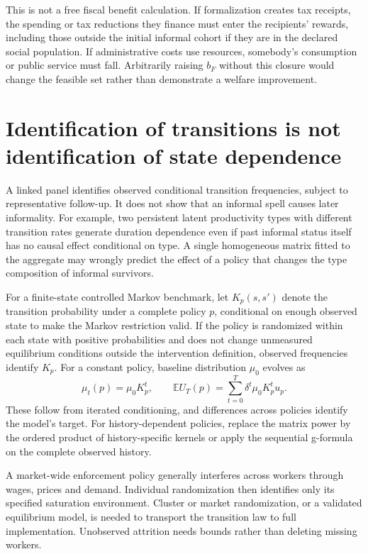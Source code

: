 \documentclass[11pt]{article}
\newcommand{\E}{\mathbb E}
\begin{document}
This is not a free fiscal benefit calculation. If formalization creates tax receipts, the spending or tax reductions they finance must enter the recipients' rewards, including those outside the initial informal cohort if they are in the declared social population. If administrative costs use resources, somebody's consumption or public service must fall. Arbitrarily raising $b_F$ without this closure would change the feasible set rather than demonstrate a welfare improvement.

\section*{Identification of transitions is not identification of state dependence}
A linked panel identifies observed conditional transition frequencies, subject to representative follow-up. It does not show that an informal spell causes later informality. For example, two persistent latent productivity types with different transition rates generate duration dependence even if past informal status itself has no causal effect conditional on type. A single homogeneous matrix fitted to the aggregate may wrongly predict the effect of a policy that changes the type composition of informal survivors.

For a finite-state controlled Markov benchmark, let $K_p(s,s')$ denote the transition probability under a complete policy $p$, conditional on enough observed state to make the Markov restriction valid. If the policy is randomized within each state with positive probabilities and does not change unmeasured equilibrium conditions outside the intervention definition, observed frequencies identify $K_p$. For a constant policy, baseline distribution $\mu_0$ evolves as
\[
 \mu_t(p)=\mu_0K_p^t,\qquad
 \E U_T(p)=\sum_{t=0}^T\delta^t\mu_0K_p^t u_p.
\]
These follow from iterated conditioning, and differences across policies identify the model's target. For history-dependent policies, replace the matrix power by the ordered product of history-specific kernels or apply the sequential g-formula on the complete observed history.

A market-wide enforcement policy generally interferes across workers through wages, prices and demand. Individual randomization then identifies only its specified saturation environment. Cluster or market randomization, or a validated equilibrium model, is needed to transport the transition law to full implementation. Unobserved attrition needs bounds rather than deleting missing workers.
\end{document}
